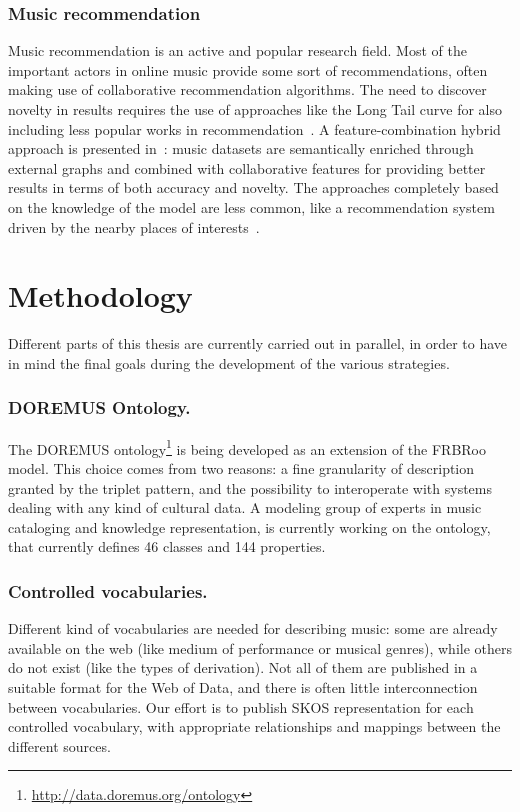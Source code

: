 \documentclass{llncs}
\begin{document}
\subsubsection*{Music recommendation}
Music recommendation is an active and popular research field. Most of the important actors in online music provide some sort of recommendations, often making use of collaborative recommendation algorithms. The need to discover novelty in results requires the use of approaches like the Long Tail curve for also including less popular works in recommendation~\cite{celma2009music}. A feature-combination hybrid approach is presented in~\cite{ostuni2015soundrec}: music datasets are semantically enriched through external graphs and combined with collaborative features for providing better results in terms of both accuracy and novelty. The approaches completely based on the knowledge of the model are less common, like a recommendation system driven by the nearby places of interests~\cite{kaminskas2012knowledge}.


\section{Methodology}
\label{sec:methodology}
Different parts of this thesis are currently carried out in parallel, in order to have in mind the final goals during the development of the various strategies.

\subsubsection*{DOREMUS Ontology.}
The DOREMUS ontology\footnote{\url{http://data.doremus.org/ontology}} is being developed as an extension of the FRBRoo model. This choice comes from two reasons: a fine granularity of description granted by the triplet pattern, and the possibility to interoperate with systems dealing with any kind of cultural data. A modeling group of experts in music cataloging and knowledge representation, is currently working on the ontology, that currently defines 46 classes and 144 properties.

\subsubsection*{Controlled vocabularies.}
Different kind of vocabularies are needed for describing music: some are already available on the web (like medium of performance or musical genres), while others do not exist (like the types of derivation). Not all of them are published in a suitable format for the Web of Data, and there is often little interconnection between vocabularies. Our effort is to publish SKOS representation for each controlled vocabulary, with appropriate relationships and mappings between the different sources.
\end{document}
